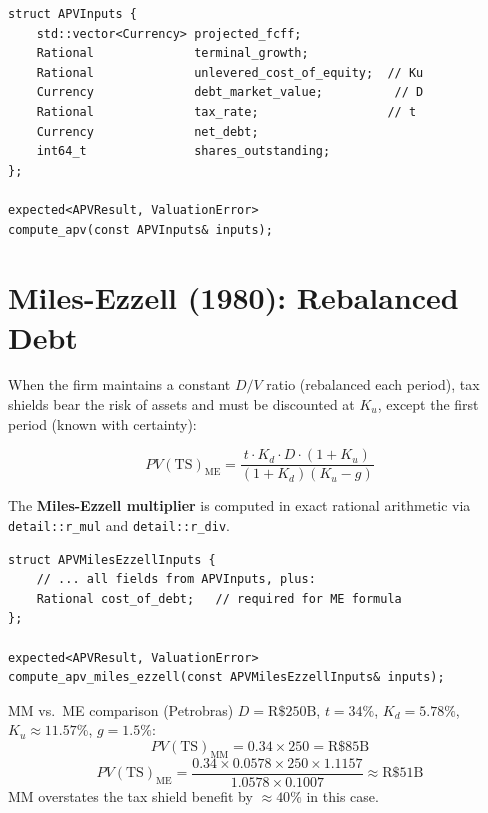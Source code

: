 \documentclass[12pt, a4paper, oneside]{book}
\newcommand{\Kd}{K_d}
\newcommand{\Ku}{K_u}
\begin{document}
\begin{lstlisting}[style=cpp]
struct APVInputs {
    std::vector<Currency> projected_fcff;
    Rational              terminal_growth;
    Rational              unlevered_cost_of_equity;  // Ku
    Currency              debt_market_value;          // D
    Rational              tax_rate;                  // t
    Currency              net_debt;
    int64_t               shares_outstanding;
};

expected<APVResult, ValuationError>
compute_apv(const APVInputs& inputs);
\end{lstlisting}

\section{Miles-Ezzell (1980): Rebalanced Debt}

When the firm maintains a constant $D/V$ ratio (rebalanced each period),
tax shields bear the risk of assets and must be discounted at $\Ku$,
except the first period (known with certainty):

\begin{equation}
  PV(\text{TS})_{\text{ME}}
  = \frac{t \cdot \Kd \cdot D \cdot (1 + \Ku)}{(1 + \Kd)(\Ku - g)}
  \label{eq:ts_me}
\end{equation}

The \textbf{Miles-Ezzell multiplier} is computed in exact rational arithmetic
via \texttt{detail::r\_mul} and \texttt{detail::r\_div}.

\begin{lstlisting}[style=cpp]
struct APVMilesEzzellInputs {
    // ... all fields from APVInputs, plus:
    Rational cost_of_debt;   // required for ME formula
};

expected<APVResult, ValuationError>
compute_apv_miles_ezzell(const APVMilesEzzellInputs& inputs);
\end{lstlisting}

\begin{example}{MM vs.\ ME comparison (Petrobras)}
$D = \text{R\$}250\text{B}$, $t = 34\%$, $\Kd = 5.78\%$,
$\Ku \approx 11.57\%$, $g = 1.5\%$:
\[
  PV(\text{TS})_{\text{MM}} = 0.34 \times 250 = \text{R\$}85\text{B}
\]
\[
  PV(\text{TS})_{\text{ME}}
  = \frac{0.34 \times 0.0578 \times 250 \times 1.1157}{1.0578 \times 0.1007}
  \approx \text{R\$}51\text{B}
\]
MM overstates the tax shield benefit by $\approx 40\%$ in this case.
\end{example}

\end{document}
